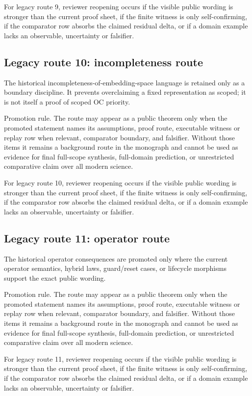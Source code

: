 For legacy route 9, reviewer reopening occurs if the visible public wording is stronger than the current proof sheet, if the finite witness is only self-confirming, if the comparator row absorbs the claimed residual delta, or if a domain example lacks an observable, uncertainty or falsifier.


\subsection{Legacy route 10: incompleteness route}

The historical incompleteness-of-embedding-space language is retained only as a boundary discipline. It prevents overclaiming a fixed representation as scoped; it is not itself a proof of scoped OC priority.


Promotion rule. The route may appear as a public theorem only when the promoted statement names its assumptions, proof route, executable witness or replay row when relevant, comparator boundary, and falsifier. Without those items it remains a background route in the monograph and cannot be used as evidence for final full-scope synthesis, full-domain prediction, or unrestricted comparative claim over all modern science.


For legacy route 10, reviewer reopening occurs if the visible public wording is stronger than the current proof sheet, if the finite witness is only self-confirming, if the comparator row absorbs the claimed residual delta, or if a domain example lacks an observable, uncertainty or falsifier.


\subsection{Legacy route 11: operator route}

The historical operator consequences are promoted only where the current operator semantics, hybrid laws, guard/reset cases, or lifecycle morphisms support the exact public wording.


Promotion rule. The route may appear as a public theorem only when the promoted statement names its assumptions, proof route, executable witness or replay row when relevant, comparator boundary, and falsifier. Without those items it remains a background route in the monograph and cannot be used as evidence for final full-scope synthesis, full-domain prediction, or unrestricted comparative claim over all modern science.


For legacy route 11, reviewer reopening occurs if the visible public wording is stronger than the current proof sheet, if the finite witness is only self-confirming, if the comparator row absorbs the claimed residual delta, or if a domain example lacks an observable, uncertainty or falsifier.


